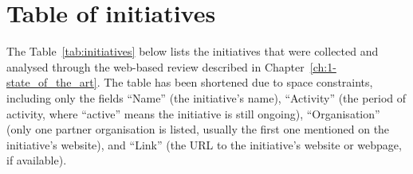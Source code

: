 \chapter{\label{ax:e-table_of_initiatives}Table of initiatives}

The Table~\ref{tab:initiatives} below lists the initiatives that were collected and analysed through the web-based review described in Chapter~\ref{ch:1-state_of_the_art}. The table has been shortened due to space constraints, including only the fields ``Name'' (the initiative’s name), ``Activity'' (the period of activity, where ``active'' means the initiative is still ongoing), ``Organisation'' (only one partner organisation is listed, usually the first one mentioned on the initiative’s website), and ``Link'' (the URL to the initiative’s website or webpage, if available).    

